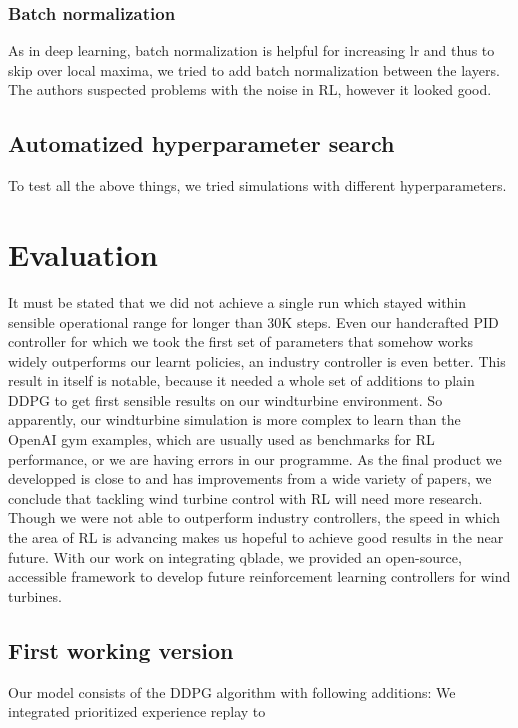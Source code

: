 \documentclass[hyperref,german,beleg]{cgvpub}
\begin{document}
\subsection{Batch normalization}
As in deep learning, batch normalization is helpful for increasing lr and thus to skip over local maxima, we tried to add batch normalization between the layers. The authors suspected problems with the noise in RL, however it looked good.

\section{Automatized hyperparameter search}

To test all the above things, we tried simulations with different hyperparameters. 

\chapter{Evaluation}

It must be stated that we did not achieve a single run which stayed within sensible operational range for longer than 30K steps. Even our handcrafted PID controller for which we took the first set of parameters that somehow works widely outperforms our learnt policies, an industry controller is even better. This result in itself is notable, because it needed a whole set of additions to plain \ac{DDPG} to get first sensible results on our windturbine environment. So apparently, our windturbine simulation is more complex to learn than the OpenAI gym examples, which are usually used as benchmarks for \ac{RL} performance, or we are having errors in our programme. As the final product we developped is close to \cite{fujimotoAddressingFunctionApproximation2018} and has improvements from a wide variety of papers, we conclude that tackling wind turbine control with \ac{RL} will need more research. Though we were not able to outperform industry controllers, the speed in which the area of \ac{RL} is advancing makes us hopeful to achieve good results in the near future. With our work on integrating qblade, we provided an open-source, accessible framework to develop future reinforcement learning controllers for wind turbines. 

\section{First working version}

Our model consists of the DDPG algorithm with following additions:
We integrated prioritized experience replay to
\end{document}
